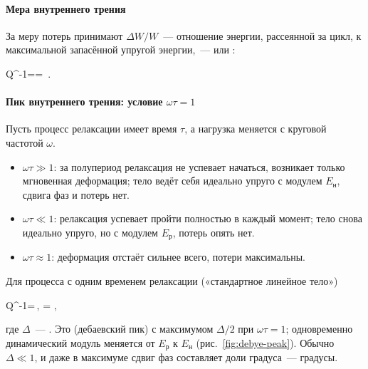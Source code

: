 \paragraph{Мера внутреннего трения}
За меру потерь принимают  $\Delta W/W$~—
отношение энергии, рассеянной за цикл, к максимальной запасённой
упругой энергии,~— или :
\begin{keyeq}\label{eq:Q-1}
Q^{-1}=\delta=\, .
\end{keyeq}

\paragraph{Пик внутреннего трения: условие $\omega\tau=1$}
Пусть процесс релаксации имеет время $\tau$, а нагрузка меняется с круговой
частотой $\omega$.
\begin{itemize}
\item $\omega\tau\gg1$: за полупериод релаксация не успевает начаться,
возникает только мгновенная деформация; тело ведёт себя идеально
упруго с модулем $E_\text{н}$, сдвига фаз и потерь нет.
\item $\omega\tau\ll1$: релаксация успевает пройти полностью в каждый
момент; тело снова идеально упруго, но с модулем $E_\text{р}$, потерь опять
нет.
\item $\omega\tau\approx1$: деформация отстаёт сильнее всего, потери
максимальны.
\end{itemize}
Для процесса с одним временем релаксации («стандартное линейное тело»)
\begin{keyeq}\label{eq:debye-peak}
Q^{-1}=\Delta\,,\qquad
\Delta= ,
\end{keyeq}
где $\Delta$~— . Это 
(дебаевский пик) с максимумом $\Delta/2$ при $\omega\tau=1$; одновременно
динамический модуль меняется от $E_\text{р}$ к $E_\text{н}$
(рис.~\ref{fig:debye-peak}). Обычно $\Delta\ll1$, и даже в максимуме сдвиг
фаз составляет доли градуса~— градусы.


